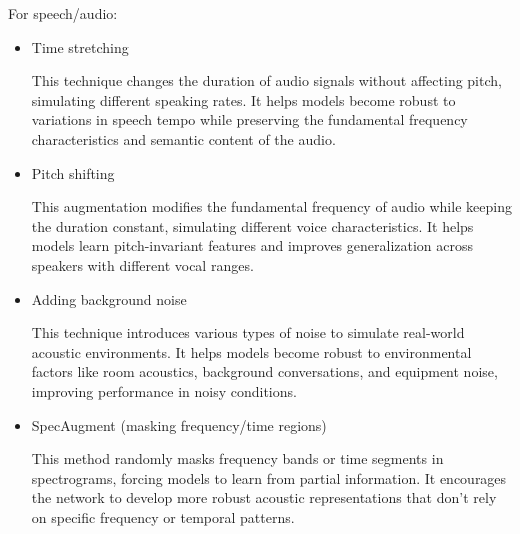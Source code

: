 For speech/audio:
\begin{itemize}
    \item Time stretching
    
    This technique changes the duration of audio signals without affecting pitch, simulating different speaking rates. It helps models become robust to variations in speech tempo while preserving the fundamental frequency characteristics and semantic content of the audio.
    
    \item Pitch shifting
    
    This augmentation modifies the fundamental frequency of audio while keeping the duration constant, simulating different voice characteristics. It helps models learn pitch-invariant features and improves generalization across speakers with different vocal ranges.
    
    \item Adding background noise
    
    This technique introduces various types of noise to simulate real-world acoustic environments. It helps models become robust to environmental factors like room acoustics, background conversations, and equipment noise, improving performance in noisy conditions.
    
    \item SpecAugment (masking frequency/time regions)
    
    This method randomly masks frequency bands or time segments in spectrograms, forcing models to learn from partial information. It encourages the network to develop more robust acoustic representations that don't rely on specific frequency or temporal patterns.
\end{itemize}

